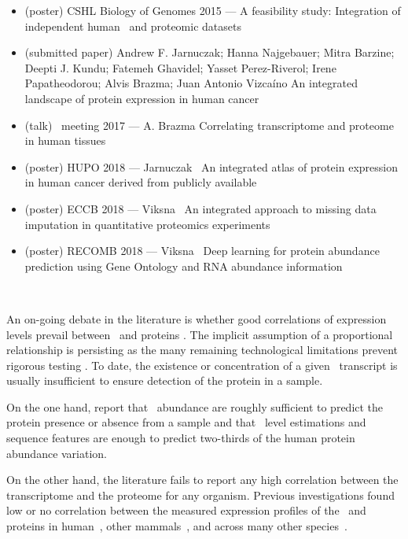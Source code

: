 \clearpage
\derivativeWork{}
\begin{itemize}[topsep=0pt,nosep]
    \item (poster) CSHL  Biology of Genomes 2015 --- A feasibility study:
        Integration of independent human \Rnaseq\ and proteomic datasets
    \item (submitted paper) Andrew F. Jarnuczak; Hanna Najgebauer; Mitra Barzine;
        Deepti J. Kundu; Fatemeh Ghavidel; Yasset Perez-Riverol; Irene Papatheodorou; Alvis Brazma;
        Juan Antonio Vizcaíno An integrated landscape of protein expression in human cancer
    \item (talk) \gtex\ meeting 2017 --- A. Brazma Correlating transcriptome
        and proteome in human tissues
    \item (poster) HUPO 2018 --- Jarnuczak \etal\ An integrated atlas of
        protein expression in human cancer derived from publicly available
    \item (poster) ECCB 2018 --- Viksna \etal\ An integrated approach
        to missing data imputation in quantitative proteomics experiments
    \item (poster) RECOMB 2018 --- Viksna \etal\ Deep learning
        for protein abundance prediction using Gene Ontology and RNA abundance information
\end{itemize}

\clearpage\


An on-going debate in the literature is
whether good correlations of expression levels prevail
between \mRNAs\ and proteins .
The implicit assumption of a proportional relationship is persisting
as the many remaining technological limitations prevent
rigorous testing .
To date, the existence or concentration of a given \mRNA\ transcript
is usually insufficient to ensure detection of the protein in a sample.\mybr\

On the one hand,
\citet{Ramakrishnan2009-lv} report that
\mRNAs\ abundance are roughly sufficient to predict
the protein presence or absence from a sample and
\citet{Vogel2010-ux} that
\mRNA\ level estimations and sequence features are enough to predict
two-thirds of the human protein abundance variation.\mybr\

On the other hand,
the literature fails to report any high correlation
between the transcriptome and the proteome for any organism.
Previous investigations found low or no correlation
between the measured expression profiles of the \mRNAs\ and
proteins in human~,
other mammals~,
and across many other species~.\mybr\

